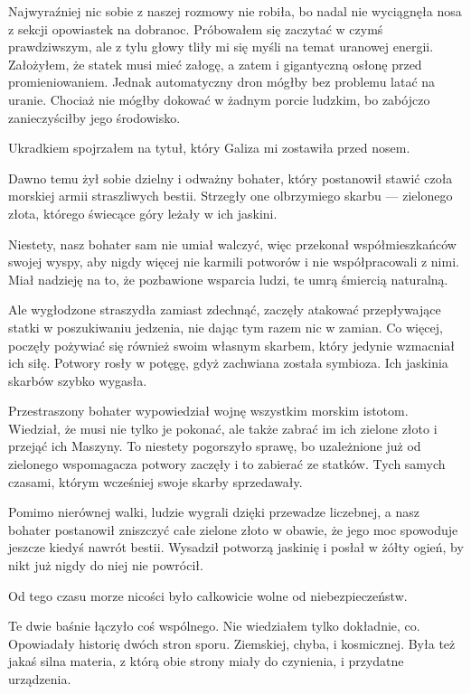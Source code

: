 Najwyraźniej nic sobie z naszej rozmowy nie robiła, bo nadal nie wyciągnęła nosa z sekcji opowiastek na dobranoc.
Próbowałem się zaczytać w czymś prawdziwszym, ale z tylu głowy tliły mi się myśli na temat uranowej energii.
Założyłem, że statek musi mieć załogę, a zatem i gigantyczną osłonę przed promieniowaniem.
Jednak automatyczny dron mógłby bez problemu latać na uranie.
Chociaż nie mógłby dokować w żadnym porcie ludzkim, bo zabójczo zanieczyściłby jego środowisko.

Ukradkiem spojrzałem na tytuł, który Galiza mi zostawiła przed nosem.

\begin{poem}
	Dawno temu żył sobie dzielny i odważny bohater, który postanowił stawić czoła morskiej armii straszliwych bestii. 
	Strzegły one olbrzymiego skarbu --- zielonego złota, którego świecące góry leżały w ich jaskini.
	
	Niestety, nasz bohater sam nie umiał walczyć, więc przekonał współmieszkańców swojej wyspy, aby nigdy więcej nie karmili potworów i nie współpracowali z nimi. 
	Miał nadzieję na to, że pozbawione wsparcia ludzi, te umrą śmiercią naturalną.
	
	Ale wygłodzone straszydła zamiast zdechnąć, zaczęły atakować przepływające statki w poszukiwaniu jedzenia, nie dając tym razem nic w zamian. 
	Co więcej, poczęły pożywiać się również swoim własnym skarbem, który jedynie wzmacniał ich siłę. 
	Potwory rosły w potęgę, gdyż zachwiana została symbioza.
	Ich jaskinia skarbów szybko wygasła.
	
	Przestraszony bohater wypowiedział wojnę wszystkim morskim istotom. 
	Wiedział, że musi nie tylko je pokonać, ale także zabrać im ich zielone złoto i przejąć ich Maszyny.
	To niestety pogorszyło sprawę, bo uzależnione już od zielonego wspomagacza potwory zaczęły i to zabierać ze statków. 
	Tych samych czasami, którym wcześniej swoje skarby sprzedawały.
	
	Pomimo nierównej walki, ludzie wygrali dzięki przewadze liczebnej, a nasz bohater postanowił zniszczyć całe zielone złoto w obawie, że jego moc spowoduje jeszcze kiedyś nawrót bestii. 
	Wysadził potworzą jaskinię i posłał w żółty ogień, by nikt już nigdy do niej nie powrócił.
	
	Od tego czasu morze nicości było całkowicie wolne od niebezpieczeństw.
\end{poem}

Te dwie baśnie łączyło coś wspólnego. Nie wiedziałem tylko dokładnie, co. Opowiadały historię dwóch stron sporu. Ziemskiej, chyba, i kosmicznej.
Była też jakaś silna materia, z którą obie strony miały do czynienia, i przydatne urządzenia.

